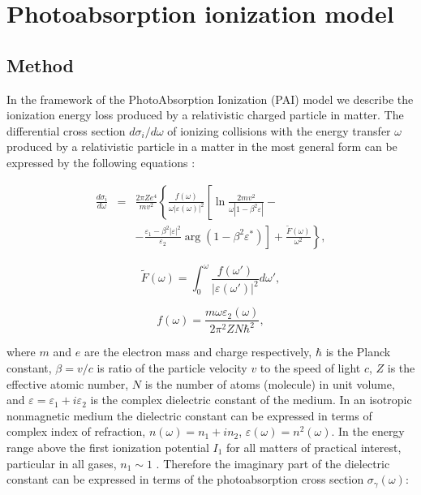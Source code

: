 \chapter[Photoabsorption ionization model]{Photoabsorption ionization model}

\section{Method}

In the framework of the PhotoAbsorption Ionization (PAI) model we describe the 
ionization energy loss produced by a relativistic charged particle in matter. 
The differential 
cross section $d\sigma_i/d\omega$ of ionizing collisions with the energy transfer
$\omega$ produced by a relativistic
particle in a matter in the most general form can be expressed by the following
equations \cite{asosk}:

\begin{eqnarray}
\frac{d\sigma_i}{d\omega} 
& = & \frac{2\pi Ze^4}{mv^2}    
\left\{
\frac{f(\omega)}{\omega\left|\varepsilon(\omega)\right|^2}
\left[
\ln\frac{2mv^2}{\omega\left|1-\beta^2\varepsilon\right|} -  
\right. \right. \nonumber \\
&& \left. \left.
- \frac{\varepsilon_1 - \beta^2\left|\varepsilon\right|^2}{\varepsilon_2}
\arg(1-\beta^2\varepsilon^*)
\right] + 
 \frac{\tilde{F}(\omega)}{\omega^2}
\right\} ,
\end{eqnarray}

\[
\tilde{F}(\omega) = \int_{0}^{\omega}\frac{f(\omega')}
{\left|\varepsilon(\omega')\right|^2}d\omega' ,
\]

\[
f(\omega) = \frac{m\omega\varepsilon_2(\omega)}{2\pi^2ZN\hbar^2} ,
\]

where $m$ and $e$ are the electron mass and charge respectively, $\hbar$ is
the Planck constant, $\beta = v/c$ is ratio of the particle velocity $v$ to
the speed of light $c$, $Z$ is the effective atomic number, $N$ is the number of
atoms (molecule) in unit volume, and $\varepsilon = \varepsilon_1 + i\varepsilon_2$
 is the complex dielectric constant of the medium. In an isotropic nonmagnetic 
medium
the dielectric constant can be expressed in terms of complex index of refraction, 
$n(\omega) = n_1 + in_2$, $\varepsilon(\omega) = n^2(\omega)$. In the energy range
above the first ionization potential $I_1$ for all matters of practical interest,
particular in all gases, $n_1 \sim 1$ . Therefore the imaginary part of the
dielectric constant can be expressed in terms of the photoabsorption cross
section $\sigma_{\gamma}(\omega)$:

